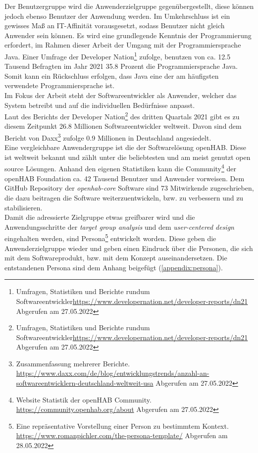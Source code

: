         Der Benutzergruppe wird die Anwenderzielgruppe gegenübergestellt, diese können jedoch ebenso Benutzer der Anwendung 
        werden. Im Umkehrschluss ist ein gewisses Maß an \acs{IT}-Affinität vorausgesetzt, sodass Benutzer nicht gleich 
        Anwender sein können. Es wird eine grundlegende Kenntnis der Programmierung erfordert, im Rahmen dieser Arbeit 
        der Umgang mit der Programmiersprache Java. Einer Umfrage der Developer Nation\footnote{Umfragen, Statistiken und Berichte rundum Softwareentwickler\url{https://www.developernation.net/developer-reports/dn21} Abgerufen am 27.05.2022} 
        zufolge, benutzen von ca. 12.5 Tausend Befragten im Jahr 2021 35.8 Prozent die Programmiersprache Java. Somit kann 
        ein Rückschluss erfolgen, dass Java eine der am häufigsten verwendete Programmiersprache ist.
        \\
        \linebreak
        Im Fokus der Arbeit steht der Softwareentwickler als Anwender, welcher das System betreibt und auf die 
        individuellen Bedürfnisse anpasst. 
        \\
        Laut des Berichts der Developer Nation\footnote{Umfragen, Statistiken und Berichte rundum Softwareentwickler\url{https://www.developernation.net/developer-reports/dn21} Abgerufen am 27.05.2022}
        des dritten Quartals 2021 gibt es zu diesem Zeitpunkt 26.8 Millionen Softwareentwickler weltweit. Davon sind dem 
        Bericht von Daxx\footnote{Zusammenfassung mehrerer Berichte. \url{https://www.daxx.com/de/blog/entwicklungstrends/anzahl-an-softwareentwicklern-deutschland-weltweit-usa} Abgerufen am 27.05.2022}
        zufolge 0.9 Millionen in Deutschland angesiedelt. 
        \\
        \linebreak
        Eine vergleichbare Anwendergruppe ist die der Softwarelösung openHAB. Diese ist weltweit bekannt und zählt unter die 
        beliebtesten und am meist genutzt open source Lösungen. Anhand den eigenen Statistiken kann die Community\footnote{Website Statistik der openHAB Community. \url{https://community.openhab.org/about} Abgerufen am 27.05.2022} 
        der openHAB Foundation ca. 42 Tausend Benutzer und Anwender vorweisen. Dem GitHub Repository der \textit{openhab-core} 
        Software sind 73 Mitwirkende zugeschrieben, die dazu beitragen die Software weiterzuentwickeln, bzw. zu verbessern und zu 
        stabilisieren.
    \\
    \linebreak 
    Damit die adressierte Zielgruppe etwas greifbarer wird und die Anwendungsschritte der \textit{target group analysis} und 
    dem \textit{user-centered design} eingehalten werden, sind Persona\footnote{Eine repräsentative Vorstellung einer Person zu bestimmtem Kontext. \url{https://www.romanpichler.com/the-persona-template/} Abgerufen am 28.05.2022} 
    entwickelt worden. Diese geben die Anwenderzielgruppe wieder und geben einen Eindruck über die Personen, die sich mit dem 
    Softwareprodukt, bzw. mit dem Konzept auseinandersetzen. Die entstandenen Persona sind dem Anhang beigefügt 
    (\ref{appendix:persona}). %

